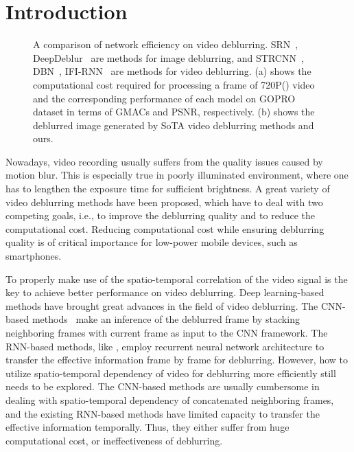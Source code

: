 \documentclass[twocolumn]{svjour3}          \smartqed  \usepackage{graphicx}
\begin{document}
\section{Introduction}
\label{sec:intro}

\begin{figure*}[!t]
	\centering
{}
	\hfil
	\caption{A comparison of network efficiency on video deblurring. SRN~\cite{tao2018scale}, DeepDeblur~\cite{nah2017deep} are methods for image deblurring, and STRCNN~\cite{hyun2017online}, DBN~\cite{su2017deep}, IFI-RNN~\cite{nah2019recurrent} are methods for video deblurring. (a) shows the computational cost required for processing a frame of 720P() video and the corresponding performance of each model on GOPRO~\cite{nah2017deep} dataset in terms of GMACs and PSNR, respectively. (b) shows the deblurred image generated by SoTA video deblurring methods and ours.}
	\label{fig:efficiency}
\end{figure*}

Nowadays, video recording usually suffers from the quality issues caused by motion blur. This is especially true in poorly illuminated environment, where one has to lengthen the exposure time for sufficient brightness. A great variety of video deblurring methods have been proposed, which have to deal with two competing goals, i.e., to improve the deblurring quality and to reduce the computational cost. Reducing computational cost while ensuring deblurring quality is of critical importance for low-power mobile devices, such as smartphones.

To properly make use of the spatio-temporal correlation of the video signal is the key to achieve better performance on video deblurring. Deep learning-based methods have brought great advances in the field of video deblurring. The CNN-based methods~\cite{su2017deep,wang2019edvr} make an inference of the deblurred frame by stacking neighboring frames with current frame as input to the CNN framework. The RNN-based methods, like \cite{wieschollek2017learning,hyun2017online,zhou2019spatio,nah2019recurrent}, employ recurrent neural network architecture to transfer the effective information frame by frame for deblurring. However, how to utilize spatio-temporal dependency of video for deblurring more efficiently still needs to be explored. The CNN-based methods are usually cumbersome in dealing with spatio-temporal dependency of concatenated neighboring frames, and the existing RNN-based methods have limited capacity to transfer the effective information temporally. Thus, they either suffer from huge computational cost, or ineffectiveness of deblurring.
\end{document}
